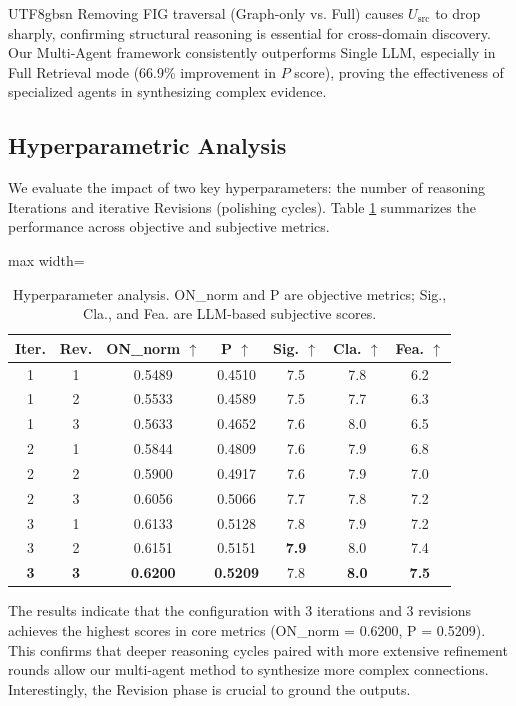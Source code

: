 \documentclass[11pt]{article}
\begin{document}
\begin{CJK}{UTF8}{gbsn}
Removing FIG traversal (Graph-only vs. Full) causes $U_{\text{src}}$ to drop sharply, confirming structural reasoning is essential for cross-domain discovery. Our Multi-Agent framework consistently outperforms Single LLM, especially in Full Retrieval mode (66.9\% improvement in $P$ score), proving the effectiveness of specialized agents in synthesizing complex evidence.

\subsection{Hyperparametric Analysis}
\label{sec:hyperparams}
We evaluate the impact of two key hyperparameters: the number of reasoning Iterations and iterative Revisions (polishing cycles). Table \ref{tab:hyperparam_results} summarizes the performance across objective and subjective metrics.

\begin{table}[H]
\centering
\small
\begin{adjustbox}{max width=\columnwidth}
\begin{tabular}{ccccccc}
\toprule
\textbf{Iter.} & \textbf{Rev.} & \textbf{ON\_norm} $\uparrow$ & \textbf{P} $\uparrow$ & \textbf{Sig.} $\uparrow$ & \textbf{Cla.} $\uparrow$ & \textbf{Fea.} $\uparrow$ \\
\midrule
1 & 1 & 0.5489 & 0.4510 & 7.5 & 7.8 & 6.2 \\
1 & 2 & 0.5533 & 0.4589 & 7.5 & 7.7 & 6.3 \\
1 & 3 & 0.5633 & 0.4652 & 7.6 & 8.0 & 6.5 \\
2 & 1 & 0.5844 & 0.4809 & 7.6 & 7.9 & 6.8 \\
2 & 2 & 0.5900 & 0.4917 & 7.6 & 7.9 & 7.0 \\
2 & 3 & 0.6056 & 0.5066 & 7.7 & 7.8 & 7.2 \\
3 & 1 & 0.6133 & 0.5128 & 7.8 & 7.9 & 7.2 \\
3 & 2 & 0.6151 & 0.5151 & \textbf{7.9} & 8.0 & 7.4 \\
\textbf{3} & \textbf{3} & \textbf{0.6200} & \textbf{0.5209} & 7.8 & \textbf{8.0} & \textbf{7.5} \\
\bottomrule
\end{tabular}
\end{adjustbox}
\caption{Hyperparameter analysis. ON\_norm and P are objective metrics; Sig., Cla., and Fea. are LLM-based subjective scores.}
\label{tab:hyperparam_results}
\end{table}

The results indicate that the configuration with 3 iterations and 3 revisions achieves the highest scores in core metrics (ON\_norm = 0.6200, P = 0.5209). This confirms that deeper reasoning cycles paired with more extensive refinement rounds allow our multi-agent method to synthesize more complex connections. Interestingly, the Revision phase is crucial to ground the outputs.


\end{CJK}
\end{document}
